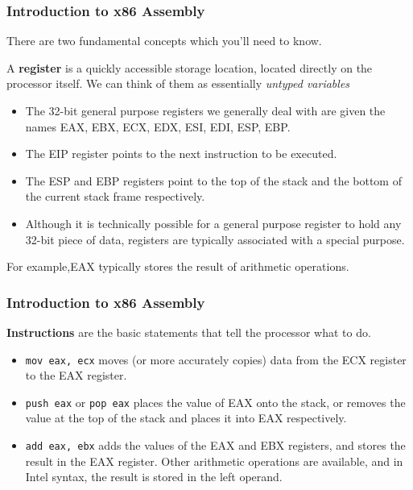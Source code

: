 \documentclass{beamer}
\begin{document}
\begin{frame}
  \frametitle{Introduction to x86 Assembly}
  There are two fundamental concepts which you'll need to know.
  \begin{definition}
    A \textbf{register} is a quickly accessible storage location, located
    directly on the processor itself. We can think of them as
    essentially \textit{untyped variables}
  \end{definition}
  \begin{itemize}
    \item The 32-bit general purpose registers we generally deal with are given the names
    EAX, EBX, ECX, EDX, ESI, EDI, ESP, EBP.
    \item The EIP register points to the next instruction to be executed.
    \item The ESP and EBP registers point to the top of the stack and the bottom
    of the current stack frame respectively.
    \item Although it is technically possible for a general purpose register to hold any 32-bit piece
    of data, registers are typically associated with a special purpose.
  \end{itemize}
  \begin{example}
    For example,EAX typically stores the result of arithmetic operations.
  \end{example}
\end{frame}

\begin{frame}
  \frametitle{Introduction to x86 Assembly}
  \begin{definition}
    \textbf{Instructions} are the basic statements that tell the processor what to do.
  \end{definition}
  \begin{examples}
    \begin{itemize}
      \item \texttt{mov eax, ecx} moves (or more accurately copies) data from
      the ECX register to the EAX register.
      \item \texttt{push eax} or \texttt{pop eax} places the value of EAX onto
      the stack, or removes the value at the top of the stack and places it into EAX
      respectively.

      \item \texttt{add eax, ebx} adds the values of the EAX and EBX registers,
      and stores the result in the EAX register. Other arithmetic operations are
      available, and in Intel syntax, the result is stored in the left operand.
    \end{itemize}
  \end{examples}
\end{frame}
\end{document}

